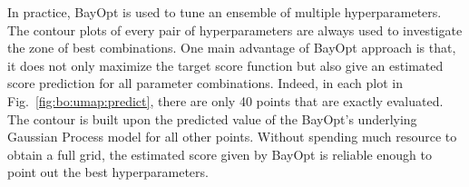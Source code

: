 In practice, BayOpt is used to tune an ensemble of multiple hyperparameters.
The contour plots of every pair of hyperparameters are always used to investigate the zone of best combinations.
One main advantage of BayOpt approach is that, it does not only maximize the target score function but also give an estimated score prediction for all parameter combinations.
Indeed, in each plot in Fig.~\ref{fig:bo:umap:predict}, there are only 40 points that are exactly evaluated.
The contour is built upon the predicted value of the BayOpt's underlying Gaussian Process model for all other points.
Without spending much resource to obtain a full grid, the estimated score given by BayOpt is reliable enough to point out the best hyperparameters.




